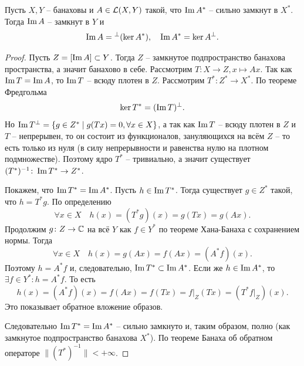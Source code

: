 \begin{theorem}\label{th:another-closability}
    Пусть $X, Y$ -- банаховы и $A \in \mathcal{L}(X, Y)$ такой, что $\operatorname{Im} A^*$ -- сильно замкнут в $X^*$.
    Тогда $\operatorname{Im} A$ -- замкнут в $Y$ и
    \[\operatorname{Im} A = {}^\perp (\ker A^*), \quad \operatorname{Im} A^* = \ker A^\perp.\]
\end{theorem}
\begin{proof}
    Пусть $Z = [\operatorname{Im} A] \subset Y$.
    Тогда $Z$ -- замкнутое подпространство банахова пространства, а значит банахово в себе.
    Рассмотрим $T\colon X \to Z, x \mapsto Ax$.
    Так как $\operatorname{Im} T = \operatorname{Im} A$, то $\operatorname{Im} T$ -- всюду плотен в $Z$.
    Рассмотрим $T^*\colon Z^* \to X^*$.
    По теореме Фредгольма 
    \[
        \ker T^* = (\operatorname{Im} T)^\perp.
    \]
    Но $\operatorname{Im} T^\perp = \{g \in Z^* \mid g(Tx) = 0, \forall x \in X\}$, а так как $\operatorname{Im} T$ -- всюду плотен в $Z$ и $T$ -- непрерывен, то он состоит из функционалов, зануляющихся на всём $Z$ -- то есть только из нуля (в силу непрерывности и равенства нулю на плотном подмножестве).
    Поэтому ядро $T^*$ -- тривиально, а значит существует $(T^*)^{-1}\colon \operatorname{Im} T^* \to Z^*$.

    Покажем, что $\operatorname{Im} T^* = \operatorname{Im} A^*$.
    Пусть $h \in \operatorname{Im} T^*$. 
    Тогда существует $g \in Z^*$ такой, что $h = T^* g$.
    По определению 
    \[
        \forall x \in X \quad h(x) = (T^*g)(x) = g(Tx) = g(Ax).
    \]
    Продолжим $g\colon Z \to \mathbb{C}$ на всё $Y$ как $f\in Y^*$ по теореме Хана-Банаха с сохранением нормы. Тогда
    \[
        \forall x \in X \quad h(x) = g(Ax) = f(Ax) = (A^* f)(x).
    \]
    Поэтому $h = A^* f$ и, следовательно, $\operatorname{Im} T^* \subset \operatorname{Im} A^*$.
    Если же $h \in \operatorname{Im} A^*$, то $\exists f \in Y^*\colon h = A^* f$.
    То есть
    \[
        h(x) = (A^*f)(x) = f(Ax) = f(Tx) = f|_{Z}(Tx) = (T^* f|_{Z})(x).
    \]
    Это показывает обратное вложение образов.

    Следовательно $\operatorname{Im} T^* = \operatorname{Im} A^*$ -- сильно замкнуто и, таким образом, полно (как замкнутое подпространство банахова $X^*$).
    По теореме Банаха об обратном операторе $\|(T^*)^{-1}\| < +\infty$.


\end{proof}
